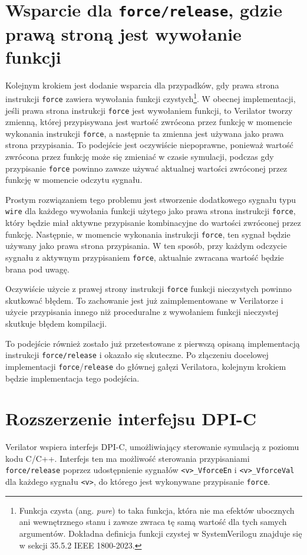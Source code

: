 \documentclass[shortabstract, inz]{iithesis}
\newcounter{kod}[chapter]
\begin{document}
\section{Wsparcie dla \texttt{force/release}, gdzie prawą stroną jest wywołanie funkcji}

Kolejnym krokiem jest dodanie wsparcia dla przypadków, gdy prawa strona instrukcji \texttt{force} zawiera wywołania funkcji czystych\footnote{Funkcja czysta (ang. \textit{pure}) to taka funkcja, która nie ma efektów ubocznych ani wewnętrznego stanu i zawsze zwraca tę samą wartość dla tych samych argumentów. Dokładna definicja funkcji czystej w SystemVerilogu znajduje się w sekcji 35.5.2 IEEE 1800-2023\cite{IEEE1800-2023}.}. W obecnej implementacji, jeśli prawa strona instrukcji \texttt{force} jest wywołaniem funkcji, to Verilator tworzy zmienną, której przypisywana jest wartość zwrócona przez funkcję w momencie wykonania instrukcji \texttt{force}, a następnie ta zmienna jest używana jako prawa strona przypisania. To podejście jest oczywiście niepoprawne, ponieważ wartość zwrócona przez funkcję może się zmieniać w czasie symulacji, podczas gdy przypisanie \texttt{force} powinno zawsze używać aktualnej wartości zwróconej przez funkcję w momencie odczytu sygnału.

Prostym rozwiązaniem tego problemu jest stworzenie dodatkowego sygnału typu \texttt{wire} dla każdego wywołania funkcji użytego jako prawa strona instrukcji \texttt{force}, który będzie miał aktywne przypisanie kombinacyjne do wartości zwróconej przez funkcję. Następnie, w momencie wykonania instrukcji \texttt{force}, ten sygnał będzie używany jako prawa strona przypisania. W ten sposób, przy każdym odczycie sygnału z aktywnym przypisaniem \texttt{force}, aktualnie zwracana wartość będzie brana pod uwagę.

Oczywiście użycie z prawej strony instrukcji \texttt{force} funkcji nieczystych powinno skutkować błędem. To zachowanie jest już zaimplementowane w Verilatorze i użycie przypisania innego niż proceduralne z wywołaniem funkcji nieczystej skutkuje błędem kompilacji.

To podejście również zostało już przetestowane z pierwszą opisaną implementacją instrukcji \texttt{force/release} i okazało się skuteczne. Po złączeniu docelowej implementacji \texttt{force}/\texttt{release} do głównej gałęzi Verilatora, kolejnym krokiem będzie implementacja tego podejścia.

\section{Rozszerzenie interfejsu DPI-C}
Verilator wspiera interfejs DPI-C, umożliwiający sterowanie symulacją z poziomu kodu C/C++. Interfejs ten ma możliwość sterowania przypisaniami \texttt{force/release} poprzez udostępnienie sygnałów \texttt{<v>\_VforceEn} i \texttt{<v>\_VforceVal} dla każdego sygnału \texttt{<v>}, do którego jest wykonywane przypisanie \texttt{force}.
    
\end{document}

